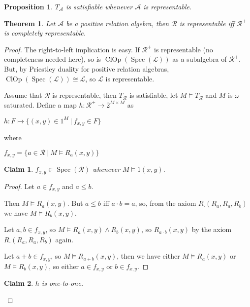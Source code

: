 \documentclass[a4paper]{article}
\theoremstyle{defin}
\theoremstyle{theorem}
\newtheorem{theorem}{Theorem}
\theoremstyle{claim}
\newtheorem{claim}{Claim}
\theoremstyle{prop}
\newtheorem{prop}{Proposition}
\theoremstyle{lemma}
\theoremstyle{fact}
\theoremstyle{ex}
\theoremstyle{col}
\begin{document}
\begin{prop}
$T_{\mathcal{A}}$ is satisfiable whenever $\mathcal{A}$ is representable.
\end{prop}

\begin{theorem}
Let $\mathcal{A}$ be a positive relation algebra, then $\mathcal{R}$ is representable iff $\mathcal{R}^{+}$ is completely representable.
\end{theorem}

\begin{proof}
The right-to-left implication is easy. If $\mathcal{R}^{+}$ is representable (no completeness needed here), so is $\operatorname{ClOp}(\operatorname{Spec}(\mathcal{L}))$ as a subalgebra of $\mathcal{R}^{+}$. But, by Priestley duality for positive relation algebras, $\operatorname{ClOp}(\operatorname{Spec}(\mathcal{L})) \cong \mathcal{L}$, so $\mathcal{L}$ is representable.

Assume that $\mathcal{R}$ is representable, then $T_{\mathcal{R}}$ is satisfiable, let $M \models T_{\mathcal{R}}$ and $M$ is $\omega$-saturated. Define a map $h : \mathcal{R}^+ \to 2^{M \times M}$ as
\begin{center}
$h : F \mapsto \{ (x, y) \in 1^M \: | \: f_{x, y} \in F \}$
\end{center}
where
\begin{center}
$f_{x, y} = \{ a \in \mathcal{R} \: | \: M \models R_a(x,y) \}$
\end{center}

\begin{claim}
$f_{x, y} \in \operatorname{Spec}(\mathcal{R})$ whenever $M \models 1(x, y)$.
\end{claim}

\begin{proof}
Let $a \in f_{x, y}$ and $a \leq b$.

Then $M \models R_a(x, y)$. But $a \leq b$ iff $a \cdot b = a$, so, from the axiom $R_{\cdot}(R_a, R_a, R_b)$ we have $M \models R_b(x, y)$.

Let $a, b \in f_{x, y}$, so $M \models R_a(x, y) \land R_b(x, y)$, so $R_{a \cdot b}(x, y)$ by the axiom $R_{\cdot}(R_a, R_a, R_b)$ again.

Let $a + b \in f_{x, y}$, so $M \models R_{a + b}(x, y)$, then we have either $M \models R_a(x, y)$ or $M \models R_b(x, y)$, so either $a \in f_{x,y}$ or $b \in f_{x,y}$.
\end{proof}

\begin{claim}
$h$ is one-to-one.
\end{claim}


\end{proof}
\end{document}
